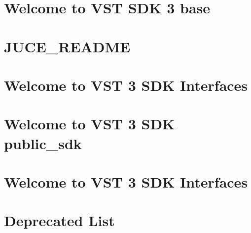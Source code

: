 \documentclass[twoside]{book}
\newcommand{\+}{\discretionary{\mbox{\scriptsize$\hookleftarrow$}}{}{}}
\begin{document}
\chapter{Welcome to VST SDK 3 base}
\label{md_build_juce_audio_processors_format_types__v_s_t3__s_d_k_base__r_e_a_d_m_e}

\chapter{JUCE\+\_\+\+README}
\label{md_build_juce_audio_processors_format_types__v_s_t3__s_d_k__j_u_c_e__r_e_a_d_m_e}

\chapter{Welcome to VST 3 SDK Interfaces}
\label{md_build_juce_audio_processors_format_types__v_s_t3__s_d_k_pluginterfaces__r_e_a_d_m_e}

\chapter{Welcome to VST 3 SDK public\+\_\+sdk}
\label{md_build_juce_audio_processors_format_types__v_s_t3__s_d_k_public_sdk__r_e_a_d_m_e}

\chapter{Welcome to VST 3 SDK Interfaces}
\label{md_build_juce_audio_processors_format_types__v_s_t3__s_d_k__r_e_a_d_m_e}

\chapter{Deprecated List}
\label{deprecated}

\end{document}
